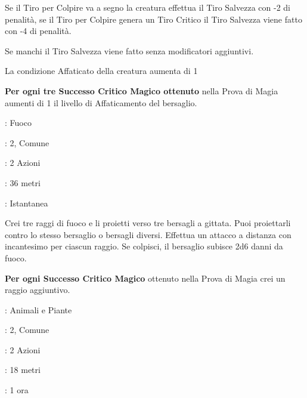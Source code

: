 \begin{multicols}{2}
Se il Tiro per Colpire va a segno la creatura effettua il Tiro Salvezza con -2 di penalità, se il Tiro per Colpire genera un Tiro Critico il Tiro Salvezza viene fatto con -4 di penalità.

Se manchi il Tiro Salvezza viene fatto senza modificatori aggiuntivi.

La condizione Affaticato della creatura aumenta di 1

\textbf{Per ogni tre Successo Critico Magico ottenuto} nella Prova di Magia aumenti di 1 il livello di Affaticamento del bersaglio.

\noindent\colorbox{OBSSgold!10}{
\begin{minipage}{0.95\linewidth}
\begin{description}[noitemsep, topsep=0pt, parsep=0pt, partopsep=0pt, leftmargin=0cm, labelwidth=1.3cm]
	\item[\textbf{Lista}]: Fuoco
	\item[\textbf{Livello}]: 2, Comune
	\item[\textbf{Lancio}]: 2 Azioni
	\item[\textbf{Gittata}]: 36 metri
	\item[\textbf{Durata}]: Istantanea
\end{description}
\end{minipage}}\smallskip

Crei tre raggi di fuoco e li proietti verso tre bersagli a gittata. Puoi proiettarli contro lo stesso bersaglio o bersagli diversi. Effettua un attacco a distanza con incantesimo per ciascun raggio. Se colpisci, il bersaglio subisce 2d6 danni da fuoco.

\textbf{Per ogni Successo Critico Magico} ottenuto nella Prova di Magia crei un raggio aggiuntivo.

\noindent\colorbox{OBSSgold!10}{
\begin{minipage}{0.95\linewidth}
\begin{description}[noitemsep, topsep=0pt, parsep=0pt, partopsep=0pt, leftmargin=0cm, labelwidth=1.3cm]
	\item[\textbf{Lista}]: Animali e Piante
	\item[\textbf{Livello}]: 2, Comune
	\item[\textbf{Lancio}]: 2 Azioni
	\item[\textbf{Gittata}]: 18 metri
	\item[\textbf{Durata}]: 1 ora
\end{description}
\end{minipage}}\smallskip


\end{multicols}
